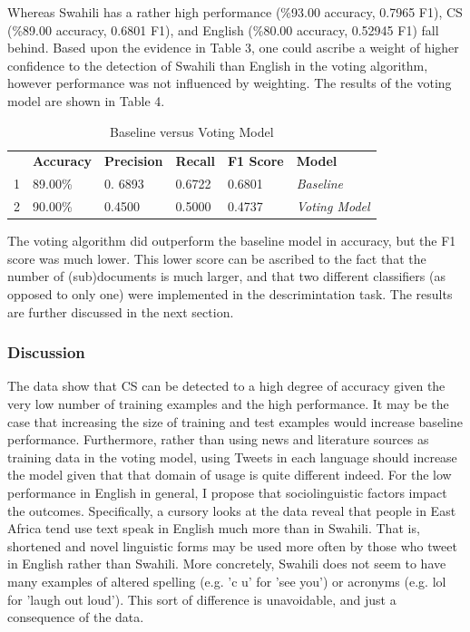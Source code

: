 \documentclass[12pt]{article}\usepackage[]{graphicx}\usepackage[]{color}
\begin{document}
Whereas Swahili has a rather high performance (\%93.00 accuracy, 0.7965 F1), CS (\%89.00 accuracy, 0.6801 F1), and English (\%80.00 accuracy, 0.52945 F1) fall behind. Based upon the evidence in Table 3, one could ascribe a weight of higher confidence to the detection of Swahili than English in the voting algorithm, however performance was not influenced by weighting. The results of the voting model are shown in Table 4.

\begin{table}[h]
\caption{Baseline versus Voting Model}
\centering
\begin{tabular}{llllll}
\cline{2-6}
  & \textbf{Accuracy} & \textbf{Precision} & \textbf{Recall} & \textbf{F1 Score} & \textbf{Model}       \\ \cline{2-6} 
1 & 89.00\%           & 0. 6893             & 0.6722          & 0.6801            & \textit{Baseline}        \\ \cline{2-6} 
2 & 90.00\%           & 0.4500             & 0.5000          & 0.4737
                                                                                 & \textit{Voting Model} \\ \cline{2-6} 
\end{tabular}
\end{table}

The voting algorithm did outperform the baseline model in accuracy, but the F1 score was much lower. This lower score can be ascribed to the fact that the number of (sub)documents is much larger, and that two different classifiers (as opposed to only one) were implemented in the descrimintation task. The results are further discussed in the next section.

\subsubsection{Discussion}

The data show that CS can be detected to a high degree of accuracy given the very low number of training examples and the high performance. It may be the case that increasing the size of training and test examples would increase baseline performance. Furthermore, rather than using news and literature sources as training data in the voting model, using Tweets in each language should increase the model given that that domain of usage is quite different indeed. For the low performance in English in general, I propose that sociolinguistic factors impact the outcomes. Specifically, a cursory looks at the data reveal that people in East Africa tend use text speak in English much more than in Swahili. That is, shortened and novel linguistic forms may be used more often by those who tweet in English rather than Swahili. More concretely, Swahili does not seem to have many examples of altered spelling (e.g. 'c u' for 'see you') or acronyms (e.g. lol for 'laugh out loud'). This sort of difference is unavoidable, and just a consequence of the data.
\end{document}
